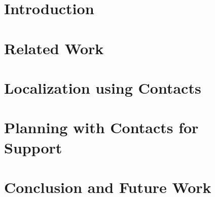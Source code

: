 \documentclass[hidelinks, 12pt]{cmuthesis}
\begin{document}
\chapter{Introduction}


\chapter{Related Work} \label{chap:related_work}


\chapter{Localization using Contacts} \label{chap:localization}


\chapter{Planning with Contacts for Support} \label{chap:planning}


\chapter{Conclusion and Future Work}


%

\backmatter


\renewcommand{\bibsection}{\chapter{\bibname}}

\nocite{*}
\end{document}

